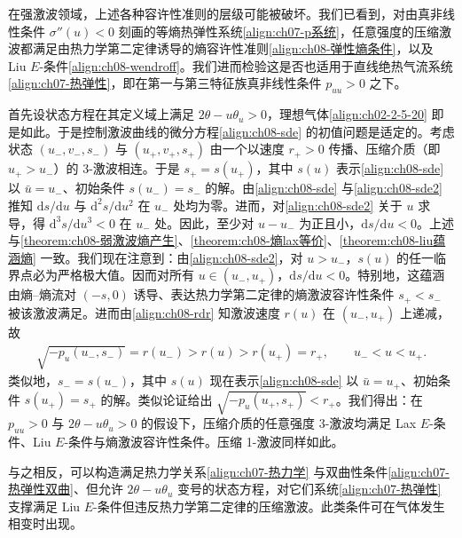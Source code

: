 \documentclass[../../main.tex]{subfiles}
\begin{document}
在强激波领域，上述各种容许性准则的层级可能被破坏。我们已看到，对由真非线性条件 $\sigma''(u)<0$ 刻画的等熵热弹性系统\eqref{align:ch07-p系统}，任意强度的压缩激波都满足由热力学第二定律诱导的熵容许性准则\eqref{align:ch08-弹性熵条件}，以及 Liu $E$-条件\eqref{align:ch08-wendroff}。我们进而检验这是否也适用于直线绝热气流系统\eqref{align:ch07-热弹性}，即在第一与第三特征族真非线性条件 $p_{uu}>0$ 之下。

首先设状态方程在其定义域上满足 $2\theta-u\theta_u>0$，理想气体\eqref{align:ch02-2-5-20} 即是如此。于是控制激波曲线的微分方程\eqref{align:ch08-sde} 的初值问题是适定的。考虑状态 $(u_-,v_-,s_-)$ 与 $(u_+,v_+,s_+)$ 由一个以速度 $r_+>0$ 传播、压缩介质（即 $u_+>u_-$）的 3-激波相连。于是 $s_+=s(u_+)$，其中 $s(u)$ 表示\eqref{align:ch08-sde} 以 $\bar u=u_-$、初始条件 $s(u_-)=s_-$ 的解。由\eqref{align:ch08-sde} 与\eqref{align:ch08-sde2} 推知 $\mathrm{d}s/\mathrm{d}u$ 与 $\mathrm{d}^2s/\mathrm{d}u^2$ 在 $u_-$ 处均为零。进而，对\eqref{align:ch08-sde2} 关于 $u$ 求导，得 $\mathrm{d}^3s/\mathrm{d}u^3<0$ 在 $u_-$ 处。因此，至少对 $u-u_-$ 为正且小，$\mathrm{d}s/\mathrm{d}u<0$。上述与\cref{theorem:ch08-弱激波熵产生}、\cref{theorem:ch08-熵lax等价}、\cref{theorem:ch08-liu蕴涵熵} 一致。我们现在注意到：由\eqref{align:ch08-sde2}，对 $u>u_-$，$s(u)$ 的任一临界点必为严格极大值。因而对所有 $u\in(u_-,u_+)$，$\mathrm{d}s/\mathrm{d}u<0$。特别地，这蕴涵由熵--熵流对 $(-s,0)$ 诱导、表达热力学第二定律的熵激波容许性条件 $s_+<s_-$ 被该激波满足。进而由\eqref{align:ch08-rdr} 知激波速度 $r(u)$ 在 $(u_-,u_+)$ 上递减，故
\begin{align}
\sqrt{-p_u(u_-,s_-)}=r(u_-)>r(u)>r(u_+)=r_+,\qquad u_-<u<u_+.
\label{align:ch08-速度不等式}
\end{align}
类似地，$s_-=s(u_-)$，其中 $s(u)$ 现在表示\eqref{align:ch08-sde} 以 $\bar u=u_+$、初始条件 $s(u_+)=s_+$ 的解。类似论证给出 $\sqrt{-p_u(u_+,s_+)}<r_+$。我们得出：在 $p_{uu}>0$ 与 $2\theta-u\theta_u>0$ 的假设下，压缩介质的任意强度 3-激波均满足 Lax $E$-条件、Liu $E$-条件与熵激波容许性条件。压缩 1-激波同样如此。

与之相反，可以构造满足热力学关系\eqref{align:ch07-热力学} 与双曲性条件\eqref{align:ch07-热弹性双曲}、但允许 $2\theta-u\theta_u$ 变号的状态方程，对它们系统\eqref{align:ch07-热弹性} 支撑满足 Liu $E$-条件但违反热力学第二定律的压缩激波。此类条件可在气体发生相变时出现。
\end{document}
